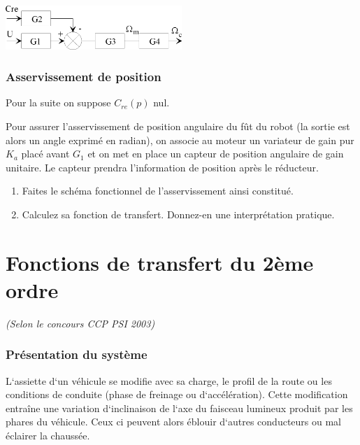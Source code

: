 \begin{center}
\includegraphics[width=0.5\textwidth]{png/fig_03-1O}
\end{center}

\subsubsection{Asservissement de position}

Pour la suite on suppose $C_{re}(p)$  nul. 

 Pour assurer l’asservissement de position angulaire du fût du robot (la sortie est alors un angle exprimé en radian), on associe au moteur un variateur de gain pur $K_a$ placé avant $G_1$ et on met en place un capteur de position angulaire de gain unitaire. Le capteur prendra l’information de position après le réducteur.
 
\begin{enumerate}
\item Faites le schéma fonctionnel de l’asservissement ainsi constitué.
\item Calculez sa fonction de transfert. Donnez-en une interprétation pratique.
\end{enumerate}
\newpage

\section{Fonctions de transfert du 2ème ordre}

\textit{(Selon le concours CCP PSI 2003)}

\subsubsection{Présentation du système}

L‘assiette d‘un véhicule se modifie avec sa charge, le profil de la route ou les
conditions de conduite (phase de freinage ou d‘accélération). Cette modification
entraîne une variation d‘inclinaison de l‘axe du faisceau lumineux produit par
les phares du véhicule. Ceux ci peuvent alors éblouir d‘autres conducteurs ou
mal éclairer la chaussée.


